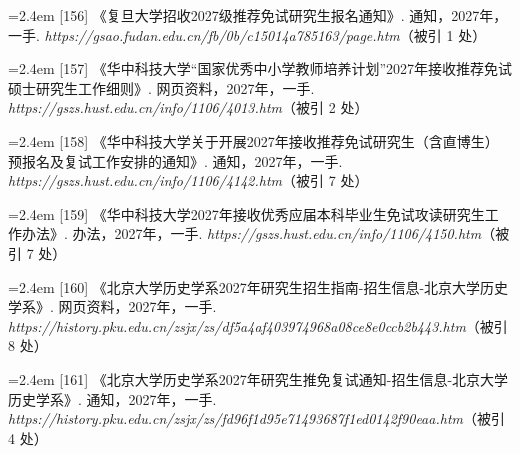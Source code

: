 {\vspace{0.6pt}
\noindent\hangindent=2.4em \label{src:S0195}{\color{cAccent}[156]} 《复旦大学招收2027级推荐免试研究生报名通知》. 通知，2027年，一手. \textit{https://gsao.fudan.edu.cn/fb/0b/c15014a785163/page.htm}（被引 1 处）\par
\vspace{0.6pt}
\vspace{3.5pt}\par
\nopagebreak\vspace{1pt}
\noindent\hangindent=2.4em \label{src:S0197}{\color{cAccent}[157]} 《华中科技大学“国家优秀中小学教师培养计划”2027年接收推荐免试硕士研究生工作细则》. 网页资料，2027年，一手. \textit{https://gszs.hust.edu.cn/info/1106/4013.htm}（被引 2 处）\par
\vspace{0.6pt}
\noindent\hangindent=2.4em \label{src:S0198}{\color{cAccent}[158]} 《华中科技大学关于开展2027年接收推荐免试研究生（含直博生）预报名及复试工作安排的通知》. 通知，2027年，一手. \textit{https://gszs.hust.edu.cn/info/1106/4142.htm}（被引 7 处）\par
\vspace{0.6pt}
\noindent\hangindent=2.4em \label{src:S0199}{\color{cAccent}[159]} 《华中科技大学2027年接收优秀应届本科毕业生免试攻读研究生工作办法》. 办法，2027年，一手. \textit{https://gszs.hust.edu.cn/info/1106/4150.htm}（被引 7 处）\par
\vspace{0.6pt}
\vspace{3.5pt}\par
\nopagebreak\vspace{1pt}
\noindent\hangindent=2.4em \label{src:S0200}{\color{cAccent}[160]} 《北京大学历史学系2027年研究生招生指南-招生信息-北京大学历史学系》. 网页资料，2027年，一手. \textit{https://history.pku.edu.cn/zsjx/zs/df5a4af403974968a08ce8e0ccb2b443.htm}（被引 8 处）\par
\vspace{0.6pt}
\noindent\hangindent=2.4em \label{src:S0201}{\color{cAccent}[161]} 《北京大学历史学系2027年研究生推免复试通知-招生信息-北京大学历史学系》. 通知，2027年，一手. \textit{https://history.pku.edu.cn/zsjx/zs/fd96f1d95e71493687f1ed0142f90eaa.htm}（被引 4 处）\par
\vspace{0.6pt}
\vspace{3.5pt}\par
}
